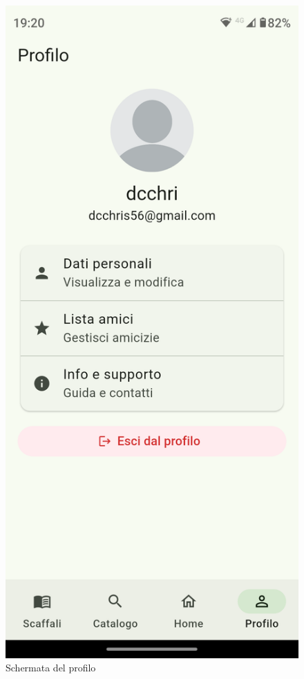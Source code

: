 \documentclass{article}
\begin{document}
\begin{figure}[H]
  \centering
  \includegraphics[width=0.6\linewidth]{profile-f.png}
  \caption{Schermata del profilo}
  \label{fig:sitemap}
\end{figure}
\end{document}
